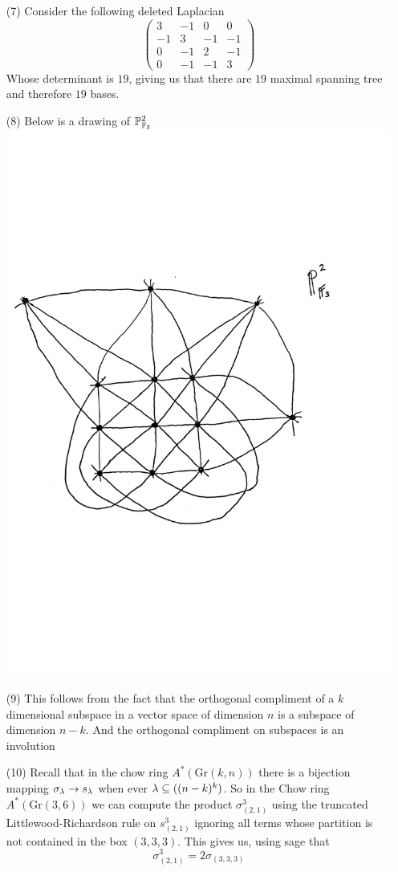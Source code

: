 \documentclass[12pt]{amsart}
\newcommand{\PPt}{\mathbb{P}}
\let\P\PPt
\begin{document}
\begin{itemize}
\item[(7)] Consider the following deleted Laplacian 
$$\begin{pmatrix}
3 &-1&0&0\\
-1&3&-1&-1\\
0&-1&2&-1\\
0&-1&-1&3\end{pmatrix}$$
Whose determinant is $19$, giving us that there are $19$ maximal spanning tree and therefore $19$ bases.\\
\item[(8)] Below is a drawing of $\P_{\F_3}^2$\\
\includegraphics[trim={0 7cm 0 6cm}, scale=.4]{pics/hw14p2f3.pdf}
\item[(9)] This follows from the fact that the orthogonal compliment of a $k$ dimensional subspace in a vector space of dimension $n$ is a subspace of dimension $n-k$. And the orthogonal compliment on subspaces is an involution\\

\item[(10)] Recall that in the chow ring $A^*(\text{Gr}(k,n))$ there is a bijection mapping $\sigma_\lambda\rightarrow s_\lambda$ when ever $\lambda\subseteq ((n-k)^k)$. So in the Chow ring $A^*(\text{Gr}(3,6))$ we can compute the product $\sigma_{(2,1)}^3$ using the truncated Littlewood-Richardson rule on $s_{(2,1)}^3$ ignoring all terms whose partition is not contained in the box $(3,3,3)$. This gives us, using sage that 
$$\sigma_{(2,1)}^3=2\sigma_{(3, 3, 3)}$$
\end{itemize}
\end{document}
